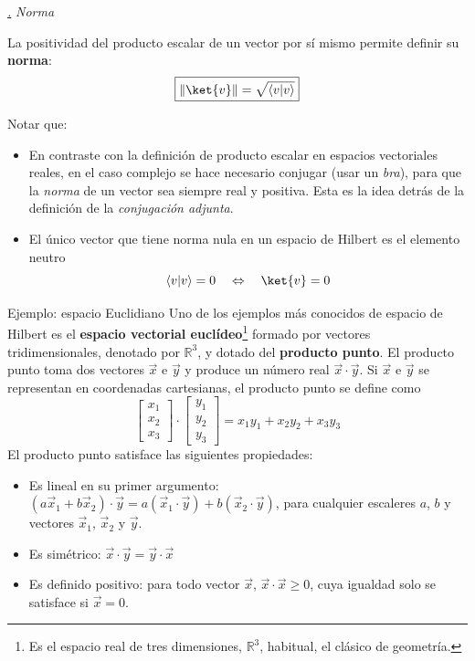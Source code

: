 \documentclass[a4paper,11pt]{book} %
\numberwithin{equation}{chapter}
\newcommand{\braket}[2]{\langle #1|#2\rangle}
\def\subsubiContadorIt{\par\addtocounter{subsubsection}{1}\underline{\it\thesubsubsection.}\hskip0.5cm \setcounter{subsubsubsectionIt}{0}}
\newcommand{\SubsubiIt}[1]{
		\subsubiContadorIt \textit{#1}
	}
\newcounter{subsubsubsectionIt}[subsubsection]
\begin{document}
			\SubsubiIt{Norma}

La positividad del producto escalar de un vector por sí mismo permite definir su \textbf{norma}:
	\begin{equation}
	\boxed{\|\ket{v}\| = \sqrt{\braket{v}{v}}}
	\end{equation}

	\begin{mybox_blue}{Notar que:}
	\begin{itemize}
		\item En contraste con la definición de producto escalar en espacios vectoriales reales, en el caso complejo se hace necesario conjugar (usar un  \textit{bra}), para  que la \textit{norma} de un vector sea siempre real y positiva. Esta es la idea detrás de la definición de la \textit{conjugación adjunta}.
		
		\item El único vector que tiene norma nula en un espacio de Hilbert es el elemento neutro
	$$
	\braket{v}{v} = 0 ~~~ \Leftrightarrow ~~~\ket{v} = 0
	$$
	\end{itemize}
	\end{mybox_blue}


	\begin{mybox_green}{Ejemplo: espacio Euclidiano}
	Uno de los ejemplos más conocidos de espacio de Hilbert es el \textbf{espacio vectorial euclídeo}\footnote{Es el espacio real de tres dimensiones, $\mathbb{R}^3$, habitual, el clásico de geometría.} formado por vectores tridimensionales, denotado por $\mathbb{R}^3$, y dotado del \textbf{producto punto}. El producto punto toma dos vectores $\vec{x}$ e $\vec{y}$ y produce un número real $\vec{x} \cdot \vec{y}$. Si $\vec{x}$ e $\vec{y}$ se representan en coordenadas cartesianas, el producto punto se define como
		\begin{equation*}
		\begin{bmatrix}
		x_1 \\ x_2 \\ x_3
		\end{bmatrix}
		\cdot
		\begin{bmatrix}
		y_1 \\ y_2 \\ y_3
		\end{bmatrix} 
		= x_1y_1 + x_2y_2 + x_3y_3
		\end{equation*}
	El producto punto satisface las siguientes propiedades:
	\begin{itemize}
		\item Es lineal en su primer argumento: $(a \vec{x}_1 + b \vec{x}_2) \cdot \vec{y} = a (\vec{x}_1 \cdot \vec{y}) + b (\vec{x}_2 \cdot \vec{y})$, para cualquier escaleres $a$, $b$ y vectores $\vec{x}_1$, $\vec{x}_2$ y $\vec{y}$.
		
		\item Es simétrico: $\vec{x} \cdot \vec{y} = \vec{y} \cdot \vec{x}$
		\item Es definido positivo: para todo vector $\vec{x}$, $\vec{x} \cdot \vec{x} \geq 0$, cuya igualdad solo se satisface si $\vec{x} = 0$.
	\end{itemize}
	\end{mybox_green}
		
\end{document}
